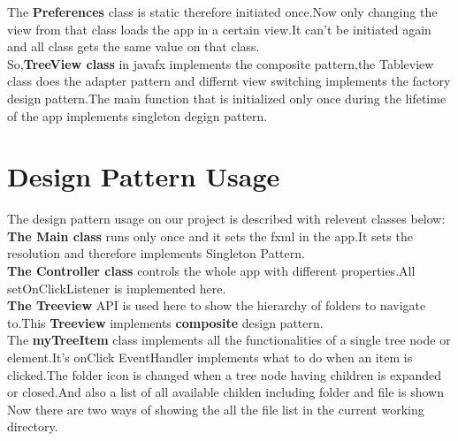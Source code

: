 \documentclass[10pt]{article}
\begin{document}
 The {\bfseries Preferences } class is static therefore initiated once.Now only changing the view from that class loads the app in a certain view.It can't be initiated again and all class gets the same value on that class.\\
 
 
 
  
 
 
 So,{\bfseries TreeView class} in javafx implements the composite pattern,the Tableview class does the adapter pattern and differnt view switching implements the factory design pattern.The main function that is initialized only once during the lifetime of the app implements singleton degign pattern.\\
 
 \newpage
 
 





\section {Design Pattern Usage	}


The design pattern usage on our project is described with relevent classes below:\\


{\bfseries The Main class} runs only once and it sets the fxml in the app.It sets the resolution and therefore implements Singleton Pattern.\\

{\bfseries The Controller class} controls the whole app with different properties.All setOnClickListener is implemented here.\\


{\bfseries The Treeview} API is used here to show the hierarchy of folders to navigate to.This {\bfseries Treeview} implements {\bfseries composite} design pattern.\\



The {\bfseries myTreeItem} class implements all the functionalities of a single tree node or element.It's onClick EventHandler implements what to do when an item is clicked.The folder icon is changed when a tree node having children is expanded or closed.And also a list of all available childen including folder and file is shown\\

Now there are two ways of showing the all the file list in the current working directory.
\end{document}
